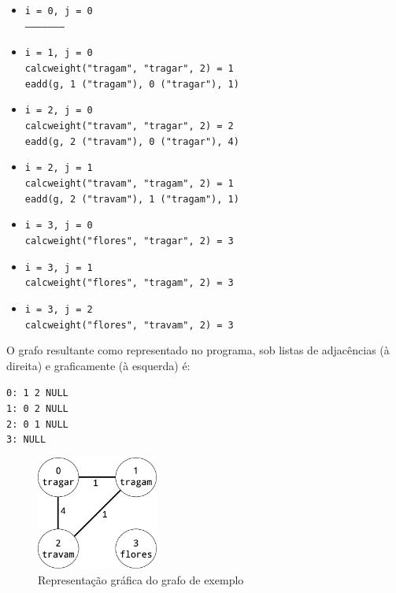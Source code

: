 \documentclass[portuguese, a4paper]{article}
\newcommand\tu[0]{\textunderscore}
\begin{document}
	\begin{itemize}
		\item
			\texttt{i = 0, j = 0} \\
			\texttt{---------------------}
		\item
			\texttt{i = 1, j = 0} \\
			\texttt{calc\tu weight("tragam", "tragar", 2) = 1} \\
			\texttt{e\tu add(g, 1 ("tragam"), 0 ("tragar"), 1)}
		\item
			\texttt{i = 2, j = 0} \\
			\texttt{calc\tu weight("travam", "tragar", 2) = 2} \\
			\texttt{e\tu add(g, 2 ("travam"), 0 ("tragar"), 4)}
		\item
			\texttt{i = 2, j = 1} \\
			\texttt{calc\tu weight("travam", "tragam", 2) = 1} \\
			\texttt{e\tu add(g, 2 ("travam"), 1 ("tragam"), 1)}
		\item
			\texttt{i = 3, j = 0} \\
			\texttt{calc\tu weight("flores", "tragar", 2) = 3}
		\item
			\texttt{i = 3, j = 1} \\
			\texttt{calc\tu weight("flores", "tragam", 2) = 3}
		\item
			\texttt{i = 3, j = 2} \\
			\texttt{calc\tu weight("flores", "travam", 2) = 3}
	\end{itemize}
	\par
	O grafo resultante como representado no programa, sob listas de adjacências
	(à direita) e graficamente (à esquerda) é: \\
	\begin{minipage}{\linewidth}
		\centering
		\begin{minipage}{0.45\linewidth}
		\begin{center}
			\texttt{0: 1 \textrightarrow{} 2 \textrightarrow{} NULL \\
					1: 0 \textrightarrow{} 2 \textrightarrow{} NULL \\
					2: 0 \textrightarrow{} 1 \textrightarrow{} NULL \\
					3: NULL}
		\end{center}
		\end{minipage}
		\hspace{0.05\linewidth}
		\begin{minipage}{0.45\linewidth}
			\begin{figure}[H]
				\centering
				\includegraphics[width=4cm]{graph}
				\caption{Representação gráfica do grafo de exemplo}
			\end{figure}
		\end{minipage}
	\end{minipage} \\
\end{document}
